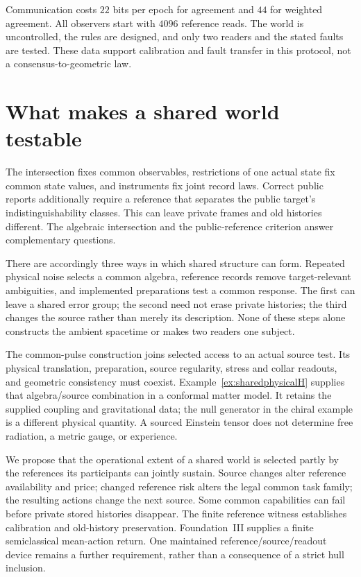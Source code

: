 \documentclass[12pt]{article}
\theoremstyle{definition}
\theoremstyle{remark}
\begin{document}
Communication costs $22$ bits per epoch for agreement and $44$ for
weighted agreement. All observers start with $4096$ reference reads.
The world is uncontrolled, the rules are designed, and only two readers
and the stated faults are tested. These data support calibration and
fault transfer in this protocol, not a consensus-to-geometric law.

\section{What makes a shared world testable}\label{sec:open}

The intersection fixes common observables, restrictions of one actual
state fix common state values, and instruments fix joint record laws.
Correct public reports additionally require a reference that separates
the public target's indistinguishability classes. This can leave
private frames and old histories different. The algebraic intersection
and the public-reference criterion answer complementary questions.

There are accordingly three ways in which shared structure can form.
Repeated physical noise selects a common algebra, reference records
remove target-relevant ambiguities, and implemented preparations test
a common response. The first can leave a shared error group; the second
need not erase private histories; the third changes the source rather
than merely its description. None of these steps alone constructs the
ambient spacetime or makes two readers one subject.

The common-pulse construction joins selected access to an actual
source test. Its physical translation, preparation, source regularity,
stress and collar readouts, and geometric consistency must coexist.
Example~\ref{ex:sharedphysicalH} supplies that algebra/source combination
in a conformal matter model. It retains the supplied coupling and
gravitational data; the null generator in the chiral example is a
different physical quantity. A sourced Einstein tensor does not
determine free radiation, a metric gauge, or experience.

We propose that the operational extent of a shared world is selected
partly by the references its participants can jointly sustain.
Source changes alter reference availability and price; changed
reference risk alters the legal common task family; the resulting
actions change the next source. Some common capabilities can fail
before private stored histories disappear. The finite reference
witness establishes calibration and old-history preservation.
Foundation~III supplies a finite semiclassical mean-action return.
One maintained reference/source/readout device remains a further
requirement, rather than a consequence of a strict hull inclusion.
\end{document}
